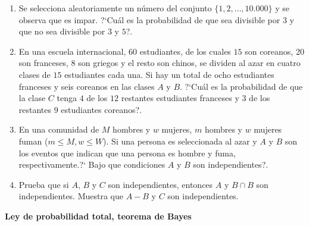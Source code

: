 \documentclass[a4paper,10pt]{report}
\begin{document}
\begin{enumerate}
\item Se selecciona aleatoriamente un n\'umero del conjunto $\{1, 2,\dots, 10.000\}$ y se observa que es impar. ?`Cu\'al es la probabilidad de que sea  divisible por $3$  y  que no sea divisible por $3$ y $5$?.
\item En una escuela internacional, $60$ estudiantes, de los cuales $15$ son coreanos, $20$ son franceses, $8$ son griegos y el resto son chinos, se dividen al azar en cuatro clases de $15$ estudiantes  cada una. Si hay un total de ocho estudiantes franceses y seis coreanos en las clases $A$ y $B$. ?`Cu\'al es la probabilidad de que la clase $C$ tenga $4$ de los $12$ restantes estudiantes  franceses y $3$ de los restantes $9$ estudiantes coreanos?.
\item En una comunidad de $M$ hombres y $w$ mujeres, $m$ hombres y $w$ mujeres fuman ($m \leq M , w \leq W $). Si una persona es seleccionada al azar y $A$ y $B$ son los eventos que indican que una  persona es  hombre y fuma, respectivamente.?` Bajo que condiciones  $A$ y $B$ son independientes?.
\item Prueba que si $A$, $B$ y $C$ son independientes, entonces $A$ y $B \cap B$ son independientes. Muestra que $A -B$ y $C$ son independientes.

\end{enumerate}
\vspace{0.5cm}

\textbf{Ley de probabilidad total, teorema de Bayes}
\end{document}
